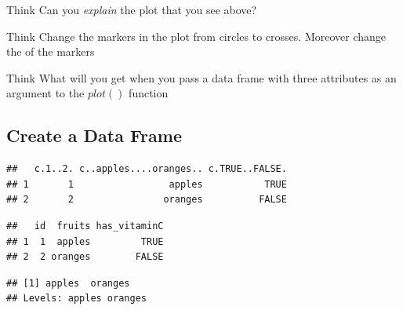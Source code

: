 \documentclass[12pt]{book}\usepackage{knitr}
\begin{document}
\begin{DIY}{Think}
Can you \emph{explain} the plot that you see above?
\end{DIY}

\begin{DIY}{Think}
Change the markers in the plot from circles to crosses. Moreover change the of the markers
\end{DIY}

\begin{DIY}{Think}
What will you get when you pass a data frame with three attributes as an argument to the $plot()$ function
\end{DIY}

\subsection{Create a Data Frame}
\begin{knitrout}
\color{fgcolor}\begin{kframe}
\begin{alltt}
\hlkwb{<-}\hlstd{(}\hlstd{(}\hlstd{,}\hlstd{),}\hlstd{(}\hlstd{,}\hlstd{),}
              \hlstd{(}\hlstd{,}\hlstd{))}  
\end{alltt}
\begin{verbatim}
##   c.1..2. c..apples....oranges.. c.TRUE..FALSE.
## 1       1                 apples           TRUE
## 2       2                oranges          FALSE
\end{verbatim}
\begin{alltt}
\hlkwb{<-}\hlstd{(}\hlstd{,}\hlstd{,}\hlstd{)} 
\end{alltt}
\begin{verbatim}
##   id  fruits has_vitaminC
## 1  1  apples         TRUE
## 2  2 oranges        FALSE
\end{verbatim}
\begin{alltt}
\hlopt{$}
\end{alltt}
\begin{verbatim}
## [1] apples  oranges
## Levels: apples oranges
\end{verbatim}
\end{kframe}
\end{knitrout}
\end{document}
